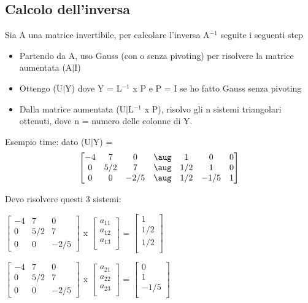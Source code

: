 \subsection{Calcolo dell'inversa}
\label{Calcolo dell'inversa}
Sia A una matrice invertibile, per calcolare l'inversa A$^{-1}$ seguite i seguenti step
\begin{itemize}
\item Partendo da A, uso Gauss (con o senza pivoting) per risolvere la matrice aumentata (A$\mid$I)
\item Ottengo (U$\mid$Y) dove Y = L$^{-1}$ x P e P = I se ho fatto Gauss senza pivoting
\item Dalla matrice aumentata (U$\mid$L$^{-1}$ x P), risolvo gli n sistemi triangolari ottenuti, dove n = numero delle colonne di Y.
\end{itemize}
\noindent

Esempio time: dato (U$\mid$Y) =
$$
\begin{bmatrix}
  -4 & 7 & 0 & \aug & 1 & 0 & 0 \\
  0 & 5/2 & 7 & \aug &1/2 & 1 & 0 \\
  0 & 0 & -2/5 & \aug & 1/2 & -1/5 & 1 
\end{bmatrix}
$$

Devo risolvere questi 3 sistemi:
\begin{center}
$
\begin{bmatrix}
-4 & 7 & 0 \\
0 & 5/2 & 7 \\
0 & 0 & -2/5 
\end{bmatrix}
$
x
$
\begin{bmatrix}
a_{11} \\
a_{12} \\
a_{13} \\
\end{bmatrix}
$
=
$
\begin{bmatrix}
1 \\
1/2 \\
1/2 \\
\end{bmatrix}
$
\end{center}


\begin{center}
$
\begin{bmatrix}
-4 & 7 & 0 \\
0 & 5/2 & 7 \\
0 & 0 & -2/5 
\end{bmatrix}
$
x
$
\begin{bmatrix}
a_{21} \\
a_{22} \\
a_{23} \\
\end{bmatrix}
$
=
$
\begin{bmatrix}
0 \\
1 \\
-1/5 \\
\end{bmatrix}
$
\end{center}



